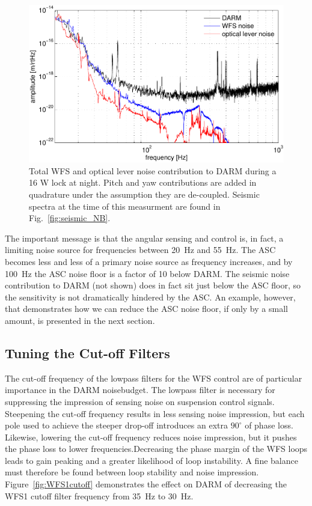 \begin{figure}
\begin{centering}
\includegraphics[width=1.0\columnwidth]{figures/ASC2DARM.pdf}
\caption[Total WFS and optical lever noise contribution to DARM during
a 16 W lock at night]{Total WFS and optical lever noise contribution
  to DARM during a 16 W lock at night. Pitch and yaw contributions are
  added in quadrature under the assumption they are
  de-coupled. Seismic spectra at the time of this measurment are found
  in Fig.~\ref{fig:seismic_NB}.}
\label{fig:asc2darm}
\end{centering}
\end{figure}

The important message is that the angular sensing and control is, in
fact, a limiting noise source for frequencies between 20~Hz and
55~Hz. The ASC becomes less and less of a primary noise source as
frequency increases, and by 100~Hz the ASC noise floor is a factor of
10 below DARM. The seismic noise contribution to DARM (not shown) does
in fact sit just below the ASC floor, so the sensitivity is not
dramatically hindered by the ASC. An example, however, that
demonstrates how we can reduce the ASC noise floor, if only by a small
amount, is presented in the next section.



\subsection{Tuning the Cut-off Filters} 
The cut-off frequency of the lowpass filters for the WFS control are
of particular importance in the DARM noisebudget. The lowpass filter
is necessary for suppressing the impression of sensing noise on
suspension control signals. Steepening the cut-off frequency results
in less sensing noise impression, but each pole used to achieve the
steeper drop-off introduces an extra $90^{\circ}$ of phase
loss. Likewise, lowering the cut-off frequency reduces noise
impression, but it pushes the phase loss to lower
frequencies.Decreasing the phase margin of the WFS loops leads to
gain peaking and a greater likelihood of loop instability. A fine
balance must therefore be found between loop stability and noise
impression. Figure~\ref{fig:WFS1cutoff} demonstrates the effect on
DARM of decreasing the WFS1 cutoff filter frequency from 35~Hz to
30~Hz.

